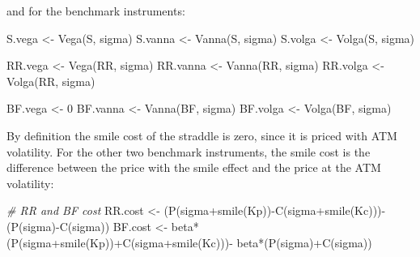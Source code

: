 \documentclass[]{tufte-book}
\newenvironment{Shaded}{}{}
\newcommand{\CommentTok}[1]{\textcolor[rgb]{0.38,0.63,0.69}{\textit{#1}}}
\newcommand{\DecValTok}[1]{\textcolor[rgb]{0.25,0.63,0.44}{#1}}
\newcommand{\FunctionTok}[1]{\textcolor[rgb]{0.02,0.16,0.49}{#1}}
\newcommand{\NormalTok}[1]{#1}
\newcommand{\OtherTok}[1]{\textcolor[rgb]{0.00,0.44,0.13}{#1}}
\newcommand{\SpecialCharTok}[1]{\textcolor[rgb]{0.25,0.44,0.63}{#1}}
\begin{document}
and for the benchmark instruments:

\begin{Shaded}
\begin{Highlighting}[]
\NormalTok{  S.vega }\OtherTok{\textless{}{-}} \FunctionTok{Vega}\NormalTok{(S, sigma)}
\NormalTok{  S.vanna }\OtherTok{\textless{}{-}} \FunctionTok{Vanna}\NormalTok{(S, sigma)}
\NormalTok{  S.volga }\OtherTok{\textless{}{-}} \FunctionTok{Volga}\NormalTok{(S, sigma)}

\NormalTok{  RR.vega }\OtherTok{\textless{}{-}} \FunctionTok{Vega}\NormalTok{(RR, sigma)}
\NormalTok{  RR.vanna }\OtherTok{\textless{}{-}} \FunctionTok{Vanna}\NormalTok{(RR, sigma)}
\NormalTok{  RR.volga }\OtherTok{\textless{}{-}} \FunctionTok{Volga}\NormalTok{(RR, sigma)}

\NormalTok{  BF.vega }\OtherTok{\textless{}{-}} \DecValTok{0}
\NormalTok{  BF.vanna }\OtherTok{\textless{}{-}} \FunctionTok{Vanna}\NormalTok{(BF, sigma)}
\NormalTok{  BF.volga }\OtherTok{\textless{}{-}} \FunctionTok{Volga}\NormalTok{(BF, sigma)}
\end{Highlighting}
\end{Shaded}

By definition the smile cost of the straddle is zero, since it is priced
with ATM volatility. For the other two benchmark instruments, the smile
cost is the difference between the price with the smile effect and the
price at the ATM volatility:

\begin{Shaded}
\begin{Highlighting}[]
  \CommentTok{\# RR and BF cost}
\NormalTok{  RR.cost }\OtherTok{\textless{}{-}}\NormalTok{ (}\FunctionTok{P}\NormalTok{(sigma}\SpecialCharTok{+}\FunctionTok{smile}\NormalTok{(Kp))}\SpecialCharTok{{-}}\FunctionTok{C}\NormalTok{(sigma}\SpecialCharTok{+}\FunctionTok{smile}\NormalTok{(Kc)))}\SpecialCharTok{{-}}\NormalTok{(}\FunctionTok{P}\NormalTok{(sigma)}\SpecialCharTok{{-}}\FunctionTok{C}\NormalTok{(sigma))}
\NormalTok{  BF.cost }\OtherTok{\textless{}{-}}\NormalTok{ beta}\SpecialCharTok{*}\NormalTok{(}\FunctionTok{P}\NormalTok{(sigma}\SpecialCharTok{+}\FunctionTok{smile}\NormalTok{(Kp))}\SpecialCharTok{+}\FunctionTok{C}\NormalTok{(sigma}\SpecialCharTok{+}\FunctionTok{smile}\NormalTok{(Kc)))}\SpecialCharTok{{-}}\NormalTok{ beta}\SpecialCharTok{*}\NormalTok{(}\FunctionTok{P}\NormalTok{(sigma)}\SpecialCharTok{+}\FunctionTok{C}\NormalTok{(sigma))}
\end{Highlighting}
\end{Shaded}
\end{document}
